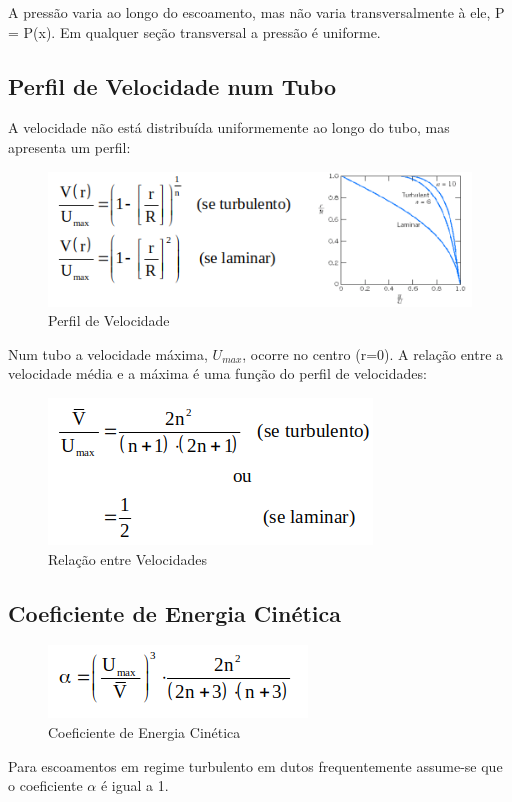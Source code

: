 \documentclass[a4paper, 12pt]{article}
\begin{document}
	A pressão varia ao longo do escoamento, mas não varia transversalmente à ele, P = P(x). 
	Em qualquer seção transversal a pressão é uniforme.

\subsection{Perfil de Velocidade num Tubo}
	A velocidade não está distribuída uniformemente ao longo do tubo, mas apresenta um perfil:
	\begin{figure}[h]
		\centering
		\includegraphics[width=0.7\linewidth]{imagens/vel}
		\caption{Perfil de Velocidade}
		\label{fig:vel}
	\end{figure}
	
	Num tubo a velocidade máxima, $U_{max}$, ocorre no centro (r=0). A relação entre a velocidade média e a máxima é uma função do perfil de velocidades:
	\begin{figure}[h]
		\centering
		\includegraphics[width=0.6\linewidth]{imagens/vel1}
		\caption{Relação entre Velocidades}
		\label{fig:vel1}
	\end{figure}
	
\subsection{Coeficiente de Energia Cinética}
	\begin{figure}[h]
		\centering
		\includegraphics[width=0.4\linewidth]{imagens/coe}
		\caption{Coeficiente de Energia Cinética}
		\label{fig:coe}
	\end{figure}
	
	Para escoamentos em regime turbulento em dutos frequentemente assume-se que o coeficiente $\alpha$ é igual a 1.\\
	
\end{document}

